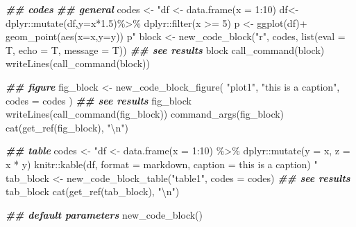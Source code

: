 \documentclass[
]{article}
\newenvironment{Shaded}{\begin{snugshade}}{\end{snugshade}}
\newcommand{\AttributeTok}[1]{\textcolor[rgb]{0.77,0.63,0.00}{#1}}
\newcommand{\DocumentationTok}[1]{\textcolor[rgb]{0.56,0.35,0.01}{\textbf{\textit{#1}}}}
\newcommand{\FunctionTok}[1]{\textcolor[rgb]{0.00,0.00,0.00}{#1}}
\newcommand{\NormalTok}[1]{#1}
\newcommand{\OtherTok}[1]{\textcolor[rgb]{0.56,0.35,0.01}{#1}}
\newcommand{\SpecialCharTok}[1]{\textcolor[rgb]{0.00,0.00,0.00}{#1}}
\newcommand{\StringTok}[1]{\textcolor[rgb]{0.31,0.60,0.02}{#1}}
\begin{document}
\begin{Shaded}
\begin{Highlighting}[]
\DocumentationTok{\#\# codes}
\DocumentationTok{\#\# general}
\NormalTok{codes }\OtherTok{\textless{}{-}} \StringTok{"df \textless{}{-} data.frame(x = 1:10)}
\StringTok{  df\textless{}{-}dplyr::mutate(df,y=x*1.5)\%\textgreater{}\%}
\StringTok{  dplyr::filter(x \textgreater{}= 5)}
\StringTok{  p \textless{}{-} ggplot(df)+}
\StringTok{  geom\_point(aes(x=x,y=y))}
\StringTok{  p"}
\NormalTok{block }\OtherTok{\textless{}{-}} \FunctionTok{new\_code\_block}\NormalTok{(}\StringTok{"r"}\NormalTok{, codes, }\FunctionTok{list}\NormalTok{(}\AttributeTok{eval =}\NormalTok{ T, }\AttributeTok{echo =}\NormalTok{ T, }\AttributeTok{message =}\NormalTok{ T))}
\DocumentationTok{\#\# see results}
\NormalTok{block}
\FunctionTok{call\_command}\NormalTok{(block)}
\FunctionTok{writeLines}\NormalTok{(}\FunctionTok{call\_command}\NormalTok{(block))}

\DocumentationTok{\#\# figure}
\NormalTok{fig\_block }\OtherTok{\textless{}{-}} \FunctionTok{new\_code\_block\_figure}\NormalTok{(}
  \StringTok{"plot1"}\NormalTok{,}
  \StringTok{"this is a caption"}\NormalTok{,}
  \AttributeTok{codes =}\NormalTok{ codes}
\NormalTok{)}
\DocumentationTok{\#\# see results}
\NormalTok{fig\_block}
\FunctionTok{writeLines}\NormalTok{(}\FunctionTok{call\_command}\NormalTok{(fig\_block))}
\FunctionTok{command\_args}\NormalTok{(fig\_block)}
\FunctionTok{cat}\NormalTok{(}\FunctionTok{get\_ref}\NormalTok{(fig\_block), }\StringTok{"}\SpecialCharTok{\textbackslash{}n}\StringTok{"}\NormalTok{)}

\DocumentationTok{\#\# table}
\NormalTok{codes }\OtherTok{\textless{}{-}} \StringTok{"df \textless{}{-} data.frame(x = 1:10) \%\textgreater{}\% }
\StringTok{  dplyr::mutate(y = x, z = x * y)}
\StringTok{  knitr::kable(df, format = \textquotesingle{}markdown\textquotesingle{}, caption = \textquotesingle{}this is a caption\textquotesingle{}) "}
\NormalTok{tab\_block }\OtherTok{\textless{}{-}} \FunctionTok{new\_code\_block\_table}\NormalTok{(}\StringTok{"table1"}\NormalTok{, }\AttributeTok{codes =}\NormalTok{ codes)}
\DocumentationTok{\#\# see results}
\NormalTok{tab\_block}
\FunctionTok{cat}\NormalTok{(}\FunctionTok{get\_ref}\NormalTok{(tab\_block), }\StringTok{"}\SpecialCharTok{\textbackslash{}n}\StringTok{"}\NormalTok{)}

\DocumentationTok{\#\# default parameters}
\FunctionTok{new\_code\_block}\NormalTok{()}
\end{Highlighting}
\end{Shaded}
\end{document}
